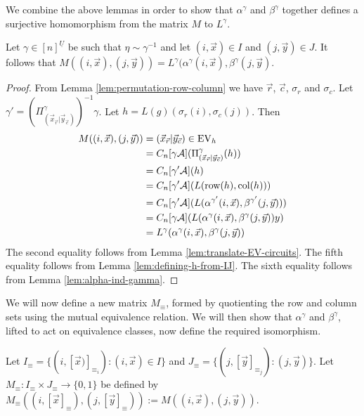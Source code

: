 \documentclass[../paper.tex]{subfiles}
\begin{document}
We combine the above lemmas in order to show that $\alpha^{\gamma}$ and
$\beta^{\gamma}$ together defines a surjective homomorphism from the matrix $M$
to $L^{\gamma}$.

\begin{thm}
  Let $\gamma\in [n]^{\underline{U}}$ be such that $\eta \sim \gamma^{-1}$ and
  let $(i, \vec{x})\in I$ and $(j, \vec{y})\in J$. It follows that $M((i,
  \vec{x}), (j, \vec{y})) = L^{\gamma}(\alpha^{\gamma}(i, \vec{x}),
  \beta^{\gamma}(j, \vec{y})$.
  \label{lem:ML-equal-elements}
\end{thm}
\begin{proof}
  From Lemma \ref{lem:permutation-row-column} we have $\vec{r}$, $\vec{c}$,
  $\sigma_r$ and $\sigma_c$. Let $\gamma' = (\Pi^{\gamma}_{(\vec{x}_{\vec{r}}
    \vert \vec{y}_{\vec{c}})})^{-1} \gamma$. Let $h = L(g)(\sigma_r(i),
  \sigma_c(j))$. Then
  \begin{align*}
    M((i, \vec{x}), (j, \vec{y}))
    &= (\vec{x}_{\vec{r}} \vert \vec{y}_{\vec{c}}) \in \text{EV}_h \\
    &= C_n[\gamma \mathcal{A}] (\Pi^{\gamma}_{(\vec{x}_{\vec{r}} \vert \vec{y}_{\vec{c}})} (h)) \\
    &= C_n[\gamma' \mathcal{A}] (h) \\
    &= C_n[\gamma' \mathcal{A}](L(\text{row}(h), \text{col} (h)))\\
    &= C_n[\gamma' \mathcal{A}](L(\alpha^{\gamma'}(i, \vec{x}), \beta^{\gamma'}(j, \vec{y})))\\
    &= C_n[\gamma \mathcal{A}](L(\alpha^{\gamma}(i, \vec{x}), \beta^{\gamma}(j, \vec{y}))y)\\
    &= L^{\gamma}(\alpha^{\gamma}(i, \vec{x}), \beta^{\gamma}(j, \vec{y}))
  \end{align*}
  The second equality follows from Lemma \ref{lem:translate-EV-circuits}. The
  fifth equality follows from Lemma \ref{lem:defining-h-from-IJ}. The sixth
  equality follows from Lemma \ref{lem:alpha-ind-gamma}.
\end{proof}

We will now define a new matrix $M_{\equiv}$, formed by quotienting the row and
column sets using the mutual equivalence relation. We will then show that
$\alpha^{\gamma}$ and $\beta^{\gamma}$, lifted to act on equivalence classes,
now define the required isomorphism.

Let $I_{\equiv} = \{(i, [\vec{x})]_{\equiv_i}) : (i, \vec{x}) \in I\}$ and
$J_\equiv = \{(j, [\vec{y}]_{\equiv_j}) : (j, \vec{y})\}$. Let $M_{\equiv} :
I_{\equiv} \times J_{\equiv} \rightarrow \{0,1\}$ be defined by $M_\equiv ((i,
[\vec{x}]_\equiv), (j, [\vec{y}]_\equiv)) := M((i,\vec{x}), (j, \vec{y}))$.
\end{document}
